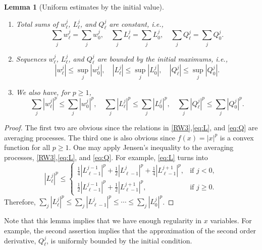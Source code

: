 \documentclass[a4paper,11pt]{article}
\newtheorem{lemma}{Lemma}[section]
\theoremstyle{remark}
\begin{document}
\begin{lemma}[Uniform estimates by the initial value] \label{uniform_est} ~

\begin{enumerate}\item Total sums of $w_\ell^j$, $L_\ell^j$, and
$Q_\ell^j$ are constant, i.e.,
$$
\sum_{j} w^j_\ell = \sum_{j} w^j_0,\quad \sum_{j} L^j_\ell = \sum_{j}
L^j_0,\quad \sum_{j} Q^j_\ell = \sum_{j} Q^j_0.
$$
\item Sequences $w_\ell^j$, $L_\ell^j$, and $Q_\ell^j$ are bounded by the
    initial maximums, i.e.,
  $$
  |w^j_\ell| \le \sup _{j} |w^j_0|,\quad  |L^j_\ell| \le \sup _{j}
  |L^j_0|,\quad |Q^j_\ell| \le \sup _{j} |Q^j_0|.
  $$
\item We also have, for $p\ge1$,
$$
\sum _{j} |w^j_\ell|^p \le \sum _{j} |w^j_0|^p,\quad\sum _{j} |L^j_\ell|^p \le \sum _{j} |L^j_0|^p,\quad \sum _{j} |Q^j_\ell|^p \le
\sum _{j} |Q^j_0|^p.
$$
\end{enumerate}
\end{lemma}
\begin{proof}
The first two are obvious since the relations in \eqref{RW3},\eqref{eq:L}, and \eqref{eq:Q} are averaging processes. The third one is also obvious since $f(x)=|x|^p$ is a convex function for all $p\ge1$. One may apply Jensen's inequality to the averaging processes, \eqref{RW3},\eqref{eq:L}, and \eqref{eq:Q}. For example, \eqref{eq:L} turns into
$$
|L^j_\ell|^p \le \left\{\begin{array}{ll}
        \frac{1}{4}|L_{\ell-1}^{j-1}|^p + \frac{1}{2}|L_{\ell-1}^j|^p +
        \frac{1}{4}|L_{\ell-1}^{j+1}|^p, & \text{if $j<0$},\\
        \frac{1}{2}|L_{\ell-1}^{j-1}|^p + \frac{1}{2}|L_{\ell-1}^{j+1}|^p, &
        \text{if $j\ge0$}.
        \end{array}\right.
$$
Therefore, $\sum _{j} |L^j_\ell|^p \le\sum _{j} |L^j_{\ell-1}|^p\le\cdots\le\sum _{j} |L^j_0|^p$.
\end{proof}

Note that this lemma implies that we have enough regularity in $x$ variables. For example, the second assertion implies that the approximation of the second order derivative, $Q^j_\ell$, is uniformly bounded by the initial condition. 
\end{document}
